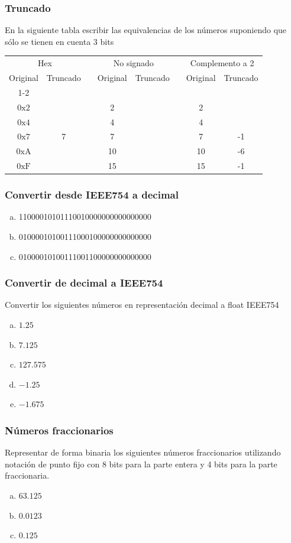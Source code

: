 \subsubsection{Truncado}
En la siguiente tabla escribir las equivalencias de los números suponiendo que sólo se tienen en cuenta 3 bits\\
    
\begin{tabular}{cccccccc}
  \multicolumn{2}{c}{Hex} & &\multicolumn{2}{c}{No signado}& &\multicolumn{2}{c}{Complemento a 2}\\
  Original&Truncado&&Original&Truncado&&Original&Truncado\\
  \cline{1-2}\cline{4-5}\cline{7-8}\\
  $\mathrm{0x2}$&\underspace&&2  &\underspace&&2 & \underspace \\
  $\mathrm{0x4}$&\underspace&&4  &\underspace&&4 & \underspace \\
  $\mathrm{0x7}$&7          &&7  &\underspace&&7 & -1\\
  $\mathrm{0xA}$&\underspace&&10 &\underspace&&10& -6\\
  $\mathrm{0xF}$&\underspace&&15 &\underspace&&15& -1\\
\end{tabular}

\subsubsection{Convertir desde IEEE754 a decimal}
\begin{enumerate}[a)]
  \item 11000010101110010000000000000000
  \item 01000010100111000100000000000000
  \item 01000010100111001100000000000000
\end{enumerate}

\subsubsection{Convertir de decimal a IEEE754}
Convertir los siguientes números en representación decimal a float IEEE754
\begin{enumerate}[a)]
  \item $1.25$
  \item $7.125$
  \item $127.575$
  \item $-1.25$
  \item $-1.675$
\end{enumerate}

\subsubsection{Números fraccionarios}
Representar de forma binaria los siguientes números fraccionarios utilizando notación de punto fijo con 8 bits para la parte entera y 4 bits para la parte fraccionaria.
\begin{enumerate}[a)]
    \item $63.125$
    \item $0.0123$
    \item $0.125$
\end{enumerate}